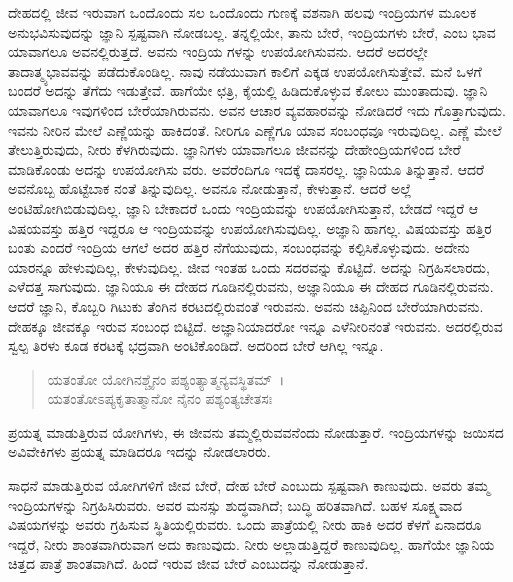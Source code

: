 ದೇಹದಲ್ಲಿ ಜೀವ ಇರುವಾಗ ಒಂದೊಂದು ಸಲ ಒಂದೊಂದು ಗುಣಕ್ಕೆ ವಶನಾಗಿ ಹಲವು ಇಂದ್ರಿಯಗಳ ಮೂಲಕ ಅನುಭವಿಸುವುದನ್ನು ಜ್ಞಾನಿ ಸ್ಪಷ್ಟವಾಗಿ ನೋಡಬಲ್ಲ. ತನ್ನಲ್ಲಿಯೇ, ತಾನು ಬೇರೆ, ಇಂದ್ರಿಯಗಳು ಬೇರೆ, ಎಂಬ ಭಾವ ಯಾವಾಗಲೂ ಅವನಲ್ಲಿರುತ್ತದೆ. ಅವನು ಇಂದ್ರಿಯ ಗಳನ್ನು ಉಪಯೋಗಿಸುವನು. ಆದರೆ ಅದರಲ್ಲೇ ತಾದಾತ್ಮ್ಯಭಾವವನ್ನು ಪಡೆದುಕೊಂಡಿಲ್ಲ. ನಾವು ನಡೆಯುವಾಗ ಕಾಲಿಗೆ ಎಕ್ಕಡ ಉಪಯೋಗಿಸುತ್ತೇವೆ. ಮನೆ ಒಳಗೆ ಬಂದರೆ ಅದನ್ನು ತೆಗೆದು ಇಡುತ್ತೇವೆ. ಹಾಗೆಯೇ ಛತ್ರಿ, ಕೈಯಲ್ಲಿ ಹಿಡಿದುಕೊಳ್ಳುವ ಕೋಲು ಮುಂತಾದುವು. ಜ್ಞಾನಿ ಯಾವಾಗಲೂ ಇವುಗಳಿಂದ ಬೇರೆಯಾಗಿರುವನು. ಅವನ ಆಚಾರ ವ್ಯವಹಾರವನ್ನು ನೋಡಿದರೆ ಇದು ಗೊತ್ತಾಗುವುದು. ಇವನು ನೀರಿನ ಮೇಲೆ ಎಣ್ಣೆಯನ್ನು ಹಾಕಿದಂತೆ. ನೀರಿಗೂ ಎಣ್ಣೆಗೂ ಯಾವ ಸಂಬಂಧವೂ ಇರುವುದಿಲ್ಲ. ಎಣ್ಣೆ ಮೇಲೆ ತೇಲುತ್ತಿರುವುದು, ನೀರು ಕೆಳಗಿರುವುದು. ಜ್ಞಾನಿಗಳು ಯಾವಾಗಲೂ ಜೀವನನ್ನು ದೇಹೇಂದ್ರಿಯಗಳಿಂದ ಬೇರೆ ಮಾಡಿಕೊಂಡು ಅದನ್ನು ಉಪಯೋಗಿಸು ವರು. ಅವರೆಂದಿಗೂ ಇದಕ್ಕೆ ದಾಸರಲ್ಲ. ಜ್ಞಾನಿಯೂ ತಿನ್ನುತ್ತಾನೆ. ಆದರೆ ಅವನೊಬ್ಬ ಹೊಟ್ಟೆಬಾಕ ನಂತೆ ತಿನ್ನುವುದಿಲ್ಲ. ಅವನೂ ನೋಡುತ್ತಾನೆ, ಕೇಳುತ್ತಾನೆ. ಆದರೆ ಅಲ್ಲೆ ಅಂಟಿಹೋಗಿಬಿಡುವುದಿಲ್ಲ. ಜ್ಞಾನಿ ಬೇಕಾದರೆ ಒಂದು ಇಂದ್ರಿಯವನ್ನು ಉಪಯೋಗಿಸುತ್ತಾನೆ, ಬೇಡದೆ ಇದ್ದರೆ ಆ ವಿಷಯವಸ್ತು ಹತ್ತಿರ ಇದ್ದರೂ ಆ ಇಂದ್ರಿಯವನ್ನು ಉಪಯೋಗಿಸುವುದಿಲ್ಲ. ಅಜ್ಞಾನಿ ಹಾಗಲ್ಲ. ವಿಷಯವಸ್ತು ಹತ್ತಿರ ಬಂತು ಎಂದರೆ ಇಂದ್ರಿಯ ಆಗಲೆ ಅದರ ಹತ್ತಿರ ನೆಗೆಯುವುದು, ಸಂಬಂಧವನ್ನು ಕಲ್ಪಿಸಿಕೊಳ್ಳುವುದು. ಅದೇನು ಯಾರನ್ನೂ ಹೇಳುವುದಿಲ್ಲ, ಕೇಳುವುದಿಲ್ಲ. ಜೀವ ಇಂತಹ ಒಂದು ಸದರವನ್ನು ಕೊಟ್ಟಿದೆ. ಅದನ್ನು ನಿಗ್ರಹಿಸಲಾರದು, ಎಳೆದತ್ತ ಸಾಗುವುದು. ಜ್ಞಾನಿಯೂ ಈ ದೇಹದ ಗೂಡಿನಲ್ಲಿರುವನು, ಅಜ್ಞಾನಿಯೂ ಈ ದೇಹದ ಗೂಡಿನಲ್ಲಿರುವನು. ಆದರೆ ಜ್ಞಾನಿ, ಕೊಬ್ಬರಿ ಗಿಟುಕು ತೆಂಗಿನ ಕರಟದಲ್ಲಿರುವಂತೆ ಇರುವನು. ಅವನು ಚಿಪ್ಪಿನಿಂದ ಬೇರೆಯಾಗಿರುವನು. ದೇಹಕ್ಕೂ ಜೀವಕ್ಕೂ ಇರುವ ಸಂಬಂಧ ಬಿಟ್ಟಿದೆ. ಅಜ್ಞಾನಿಯಾದರೋ ಇನ್ನೂ ಎಳೆನೀರಿನಂತೆ ಇರುವನು. ಅದರಲ್ಲಿರುವ ಸ್ವಲ್ಪ ತಿರಳು ಕೂಡ ಕರಟಕ್ಕೆ ಭದ್ರವಾಗಿ ಅಂಟಿಕೊಂಡಿದೆ. ಅದರಿಂದ ಬೇರೆ ಆಗಿಲ್ಲ ಇನ್ನೂ.

\begin{verse}
ಯತಂತೋ ಯೋಗಿನಶ್ಚೈನಂ ಪಶ್ಯಂತ್ಯಾತ್ಮನ್ಯವಸ್ಥಿತಮ್~।\\ಯತಂತೋಽಪ್ಯಕೃತಾತ್ಮಾನೋ ನೈನಂ ಪಶ್ಯಂತ್ಯಚೇತಸಃ 
\end{verse}

{\small ಪ್ರಯತ್ನ ಮಾಡುತ್ತಿರುವ ಯೋಗಿಗಳು, ಈ ಜೀವನು ತಮ್ಮಲ್ಲಿರುವವನೆಂದು ನೋಡುತ್ತಾರೆ. ಇಂದ್ರಿಯಗಳನ್ನು ಜಯಿಸದ ಅವಿವೇಕಿಗಳು ಪ್ರಯತ್ನ ಮಾಡಿದರೂ ಇದನ್ನು ನೋಡಲಾರರು.}

ಸಾಧನೆ ಮಾಡುತ್ತಿರುವ ಯೋಗಿಗಳಿಗೆ ಜೀವ ಬೇರೆ, ದೇಹ ಬೇರೆ ಎಂಬುದು ಸ್ಪಷ್ಟವಾಗಿ ಕಾಣುವುದು. ಅವರು ತಮ್ಮ ಇಂದ್ರಿಯಗಳನ್ನು ನಿಗ್ರಹಿಸಿರುವರು. ಅವರ ಮನಸ್ಸು ಶುದ್ಧವಾಗಿದೆ; ಬುದ್ಧಿ ಹರಿತವಾಗಿದೆ. ಬಹಳ ಸೂಕ್ಷ್ಮವಾದ ವಿಷಯಗಳನ್ನು ಅವರು ಗ್ರಹಿಸುವ ಸ್ಥಿತಿಯಲ್ಲಿರುವರು. ಒಂದು ಪಾತ್ರೆಯಲ್ಲಿ ನೀರು ಹಾಕಿ ಅದರ ಕೆಳಗೆ ಏನಾದರೂ ಇದ್ದರೆ, ನೀರು ಶಾಂತವಾಗಿರುವಾಗ ಅದು ಕಾಣುವುದು. ನೀರು ಅಲ್ಲಾಡುತ್ತಿದ್ದರೆ ಕಾಣುವುದಿಲ್ಲ. ಹಾಗೆಯೇ ಜ್ಞಾನಿಯ ಚಿತ್ತದ ಪಾತ್ರೆ ಶಾಂತವಾಗಿದೆ. ಹಿಂದೆ ಇರುವ ಜೀವ ಬೇರೆ ಎಂಬುದನ್ನು ನೋಡುತ್ತಾನೆ.

